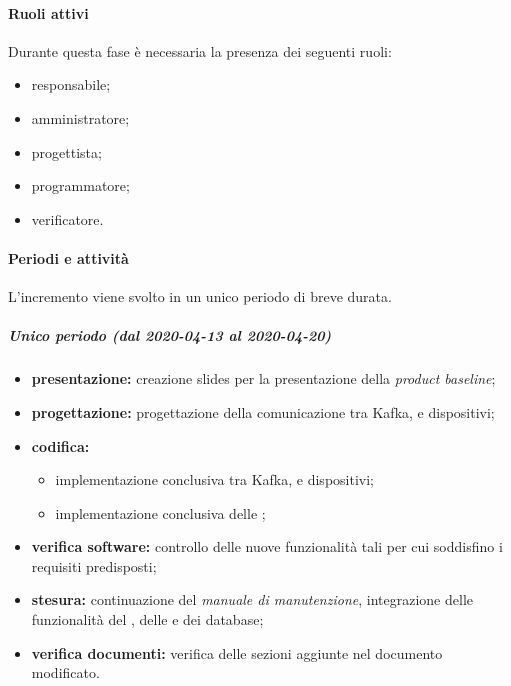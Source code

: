 			\paragraph{Ruoli attivi}
			
				Durante questa fase è necessaria la presenza dei seguenti ruoli:
				\begin{itemize}
					\item responsabile;
					\item amministratore;
					\item progettista;
					\item programmatore;
					\item verificatore.
				\end{itemize}
			
			\paragraph{Periodi e attività}
			
				L'incremento viene svolto in un unico periodo di breve durata.
				
				\subparagraph{Unico periodo (dal 2020-04-13 al 2020-04-20)}
				
					\begin{itemize}
						\item \textbf{presentazione:} creazione slides per la presentazione della \textit{product baseline};
						\item \textbf{progettazione:} progettazione della comunicazione tra Kafka,  e dispositivi;
						\item \textbf{codifica:} 
						\begin{itemize}
							\item implementazione conclusiva  tra Kafka,  e dispositivi; 
							\item implementazione conclusiva delle ;
						\end{itemize}
						\item \textbf{verifica software:} controllo delle nuove funzionalità tali per cui soddisfino i requisiti predisposti;
						\item \textbf{stesura:} continuazione del \textit{manuale di manutenzione}, integrazione delle funzionalità del , delle  e dei database;
						\item \textbf{verifica documenti:} verifica delle sezioni aggiunte nel documento modificato.
					\end{itemize} 			

